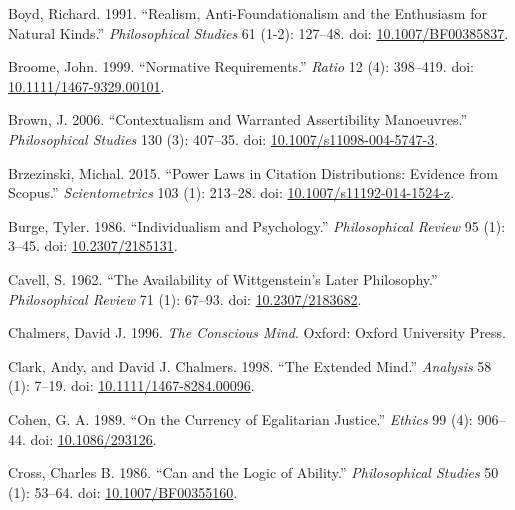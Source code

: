 \documentclass[
  11pt,
  letterpaper,
  DIV=11,
  numbers=noendperiod,
  twoside]{scrartcl}
\newlength{\cslhangindent}
\newenvironment{CSLReferences}[2] %
 {\begin{list}{}{%
  \setlength{\itemindent}{0pt}
  \setlength{\leftmargin}{0pt}
  \setlength{\parsep}{0pt}
  \ifodd #1
   \setlength{\leftmargin}{\cslhangindent}
   \setlength{\itemindent}{-1\cslhangindent}
  \fi
  \setlength{\itemsep}{#2\baselineskip}}}
 {\end{list}}
\begin{document}
\begin{CSLReferences}{1}{0}
Boyd, Richard. 1991. {``Realism, Anti-Foundationalism and the Enthusiasm
for Natural Kinds.''} \emph{Philosophical Studies} 61 (1-2): 127--48.
doi: \href{https://doi.org/10.1007/BF00385837}{10.1007/BF00385837}.

Broome, John. 1999. {``Normative Requirements.''} \emph{Ratio} 12 (4):
398--419. doi:
\href{https://doi.org/10.1111/1467-9329.00101}{10.1111/1467-9329.00101}.

Brown, J. 2006. {``Contextualism and Warranted Assertibility
Manoeuvres.''} \emph{Philosophical Studies} 130 (3): 407--35. doi:
\href{https://doi.org/10.1007/s11098-004-5747-3}{10.1007/s11098-004-5747-3}.

Brzezinski, Michal. 2015. {``Power Laws in Citation Distributions:
Evidence from Scopus.''} \emph{Scientometrics} 103 (1): 213--28. doi:
\href{https://doi.org/10.1007/s11192-014-1524-z}{10.1007/s11192-014-1524-z}.

Burge, Tyler. 1986. {``Individualism and Psychology.''}
\emph{Philosophical Review} 95 (1): 3--45. doi:
\href{https://doi.org/10.2307/2185131}{10.2307/2185131}.

Cavell, S. 1962. {``The Availability of Wittgenstein's Later
Philosophy.''} \emph{Philosophical Review} 71 (1): 67--93. doi:
\href{https://doi.org/10.2307/2183682}{10.2307/2183682}.

Chalmers, David J. 1996. \emph{The Conscious Mind}. Oxford: Oxford
University Press.

Clark, Andy, and David J. Chalmers. 1998. {``The Extended Mind.''}
\emph{Analysis} 58 (1): 7--19. doi:
\href{https://doi.org/10.1111/1467-8284.00096}{10.1111/1467-8284.00096}.

Cohen, G. A. 1989. {``On the Currency of Egalitarian Justice.''}
\emph{Ethics} 99 (4): 906--44. doi:
\href{https://doi.org/10.1086/293126}{10.1086/293126}.

Cross, Charles B. 1986. {``Can and the Logic of Ability.''}
\emph{Philosophical Studies} 50 (1): 53--64. doi:
\href{https://doi.org/10.1007/BF00355160}{10.1007/BF00355160}.


\end{CSLReferences}
\end{document}
